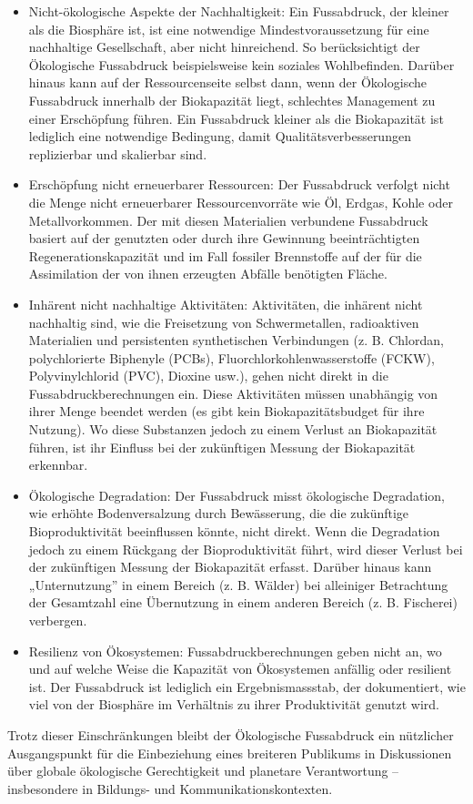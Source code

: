 \documentclass[
  nswissgerman,
  a4paper,
  openany]{book}
\begin{document}
\begin{tcolorbox}
\begin{itemize}
\item
  Nicht-ökologische Aspekte der Nachhaltigkeit: Ein Fussabdruck, der
  kleiner als die Biosphäre ist, ist eine notwendige
  Mindestvoraussetzung für eine nachhaltige Gesellschaft, aber nicht
  hinreichend. So berücksichtigt der Ökologische Fussabdruck
  beispielsweise kein soziales Wohlbefinden. Darüber hinaus kann auf der
  Ressourcenseite selbst dann, wenn der Ökologische Fussabdruck
  innerhalb der Biokapazität liegt, schlechtes Management zu einer
  Erschöpfung führen. Ein Fussabdruck kleiner als die Biokapazität ist
  lediglich eine notwendige Bedingung, damit Qualitätsverbesserungen
  replizierbar und skalierbar sind.
\item
  Erschöpfung nicht erneuerbarer Ressourcen: Der Fussabdruck verfolgt
  nicht die Menge nicht erneuerbarer Ressourcenvorräte wie Öl, Erdgas,
  Kohle oder Metallvorkommen. Der mit diesen Materialien verbundene
  Fussabdruck basiert auf der genutzten oder durch ihre Gewinnung
  beeinträchtigten Regenerationskapazität und im Fall fossiler
  Brennstoffe auf der für die Assimilation der von ihnen erzeugten
  Abfälle benötigten Fläche.
\item
  Inhärent nicht nachhaltige Aktivitäten: Aktivitäten, die inhärent
  nicht nachhaltig sind, wie die Freisetzung von Schwermetallen,
  radioaktiven Materialien und persistenten synthetischen Verbindungen
  (z. B. Chlordan, polychlorierte Biphenyle (PCBs),
  Fluorchlorkohlenwasserstoffe (FCKW), Polyvinylchlorid (PVC), Dioxine
  usw.), gehen nicht direkt in die Fussabdruckberechnungen ein. Diese
  Aktivitäten müssen unabhängig von ihrer Menge beendet werden (es gibt
  kein Biokapazitätsbudget für ihre Nutzung). Wo diese Substanzen jedoch
  zu einem Verlust an Biokapazität führen, ist ihr Einfluss bei der
  zukünftigen Messung der Biokapazität erkennbar.
\item
  Ökologische Degradation: Der Fussabdruck misst ökologische
  Degradation, wie erhöhte Bodenversalzung durch Bewässerung, die die
  zukünftige Bioproduktivität beeinflussen könnte, nicht direkt. Wenn
  die Degradation jedoch zu einem Rückgang der Bioproduktivität führt,
  wird dieser Verlust bei der zukünftigen Messung der Biokapazität
  erfasst. Darüber hinaus kann „Unternutzung'' in einem Bereich (z. B.
  Wälder) bei alleiniger Betrachtung der Gesamtzahl eine Übernutzung in
  einem anderen Bereich (z. B. Fischerei) verbergen.
\item
  Resilienz von Ökosystemen: Fussabdruckberechnungen geben nicht an, wo
  und auf welche Weise die Kapazität von Ökosystemen anfällig oder
  resilient ist. Der Fussabdruck ist lediglich ein Ergebnismassstab, der
  dokumentiert, wie viel von der Biosphäre im Verhältnis zu ihrer
  Produktivität genutzt wird.
\end{itemize}

Trotz dieser Einschränkungen bleibt der Ökologische Fussabdruck ein
nützlicher Ausgangspunkt für die Einbeziehung eines breiteren Publikums
in Diskussionen über globale ökologische Gerechtigkeit und planetare
Verantwortung -- insbesondere in Bildungs- und Kommunikationskontexten.

\end{tcolorbox}
\end{document}
